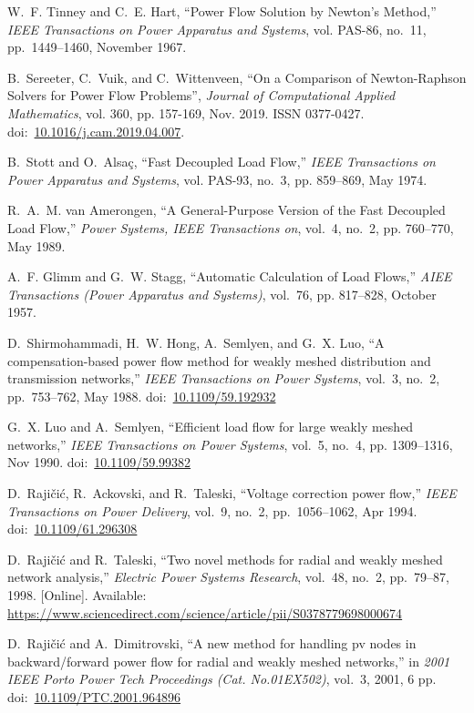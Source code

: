 \documentclass[12pt]{article}
\newcommand{\doi}[1]{doi:~\href{https://doi.org/#1}{#1}}
\numberwithin{equation}{section}
\numberwithin{table}{section}
\numberwithin{figure}{section}
\begin{document}
\begin{thebibliography}{99}
W.~F. Tinney and C.~E. Hart, ``Power Flow Solution by Newton's Method,''
  \emph{IEEE Transactions on Power Apparatus and Systems}, vol. PAS-86, no.~11,
  pp.~1449--1460, November 1967.

B.~Sereeter, C.~Vuik, and C.~Wittenveen, ``On a Comparison of Newton-Raphson Solvers for Power Flow Problems'', \emph{Journal of Computational Applied Mathematics}, vol. 360, pp. 157-169, Nov. 2019. ISSN 0377-0427. \doi{10.1016/j.cam.2019.04.007}.

B.~Stott and O.~Alsa{\c c}, ``Fast Decoupled Load Flow,'' \emph{IEEE
  Transactions on Power Apparatus and Systems}, vol. PAS-93, no.~3, pp.
  859--869, May 1974.

R.~A.~M. van Amerongen, ``A General-Purpose Version of the Fast Decoupled Load
  Flow,'' \emph{Power Systems, IEEE Transactions on}, vol.~4, no.~2, pp.
  760--770, May 1989.

A.~F. Glimm and G.~W. Stagg, ``Automatic Calculation of Load Flows,''
  \emph{AIEE Transactions (Power Apparatus and Systems)}, vol.~76, pp.
  817--828, October 1957.

D.~Shirmohammadi, H.~W. Hong, A.~Semlyen, and G.~X. Luo, ``A compensation-based
  power flow method for weakly meshed distribution and transmission networks,''
  \emph{IEEE Transactions on Power Systems}, vol.~3, no.~2, pp.~753--762, May
  1988.
  \doi{10.1109/59.192932}

G.~X. Luo and A.~Semlyen, ``Efficient load flow for large weakly meshed
  networks,'' \emph{IEEE Transactions on Power Systems}, vol.~5, no.~4, pp.
  1309--1316, Nov 1990.
  \doi{10.1109/59.99382}

D.~Raji\v{c}i\'{c}, R.~Ackovski, and R.~Taleski, ``Voltage correction power flow,''
  \emph{IEEE Transactions on Power Delivery}, vol.~9, no.~2, pp.~1056--1062,
  Apr 1994.
  \doi{10.1109/61.296308}

D.~Raji\v{c}i\'{c} and R.~Taleski, ``Two novel methods for radial and weakly
  meshed network analysis,'' \emph{Electric Power Systems Research}, vol.~48,
  no.~2, pp.~79--87, 1998. [Online]. Available:
  \url{https://www.sciencedirect.com/science/article/pii/S0378779698000674}

D.~Raji\v{c}i\'{c} and A.~Dimitrovski, ``A new method for handling pv nodes in
backward/forward power flow for radial and weakly meshed networks,'' in
\emph{2001 IEEE Porto Power Tech Proceedings (Cat. No.01EX502)}, vol.~3,
2001, 6 pp.
\doi{10.1109/PTC.2001.964896}


\end{thebibliography}
\end{document}
